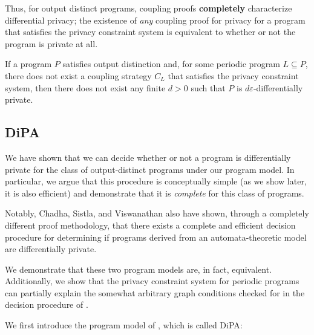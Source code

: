 Thus, for output distinct programs, coupling proofs \textbf{completely} characterize differential privacy; the existence of \textit{any} coupling proof for privacy for a program that satisfies the privacy constraint system is equivalent to whether or not the program is private at all.

\begin{thm}\label{ProgramCounterexampleThm}
    If a program $P$ satisfies output distinction and, for some periodic program $L\subseteq P$, there does not exist a coupling strategy $C_L$ that satisfies the privacy constraint system, then there does not exist any finite $d>0$ such that $P$ is $d\varepsilon$-differentially private.
\end{thm}

\subsection{DiPA}

We have shown that we can decide whether or not a program is differentially private for the class of output-distinct programs under our program model. In particular, we argue that this procedure is conceptually simple (as we show later, it is also efficient) and demonstrate that it is \textit{complete} for this class of programs.

Notably, Chadha, Sistla, and Viswanathan \cite{chadhaLinearTimeDecidability2021} also have shown, through a completely different proof methodology, that there exists a complete and efficient decision procedure for determining if programs derived from an automata-theoretic model are differentially private. 

We demonstrate that these two program models are, in fact, equivalent. Additionally, we show that the privacy constraint system for periodic programs can partially explain the somewhat arbitrary graph conditions checked for in the decision procedure of \cite{chadhaLinearTimeDecidability2021}.

We first introduce the program model of \cite{chadhaLinearTimeDecidability2021}, which is called DiPA:

